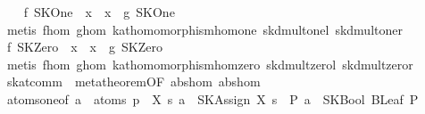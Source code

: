 \begin{isabellebody}
\isanewline
{}\isamarkupfalse%
\isanewline
\ \ \isamarkupfalse%
\ {}f\ SKOne\ {}\ x\ {}\ x\ {}\ g\ SKOne{}\isanewline
\ \ \ \ \isamarkupfalse%
\ {}metis\ f{}hom\ g{}hom\ kat{}homomorphism{}hom{}one\ skd{}mult{}onel\ skd{}mult{}oner{}\isanewline
{}\isamarkupfalse%
\isanewline
\ \ \isamarkupfalse%
\ {}f\ SKZero\ {}\ x\ {}\ x\ {}\ g\ SKZero{}\isanewline
\ \ \ \ \isamarkupfalse%
\ {}metis\ f{}hom\ g{}hom\ kat{}homomorphism{}hom{}zero\ skd{}mult{}zerol\ skd{}mult{}zeror{}\isanewline
{}\isamarkupfalse%
%
\endisatagproof
{\isafoldproof}%
%
\isadelimproof
\isanewline
%
\endisadelimproof
\isanewline
{}\isamarkupfalse%
\ skat{}comm\ {}\ metatheorem{}OF\ abs{}hom\ abs{}hom{}\isanewline
\isanewline
{}\isamarkupfalse%
\ atoms{}oneof{}\ {}a\ {}\ atoms\ p\ {}\ {}{}X\ s{}\ a\ {}\ SKAssign\ X\ s{}\ {}\ {}{}P{}\ a\ {}\ SKBool\ {}BLeaf\ P{}{}{}\isanewline

\end{isabellebody}
